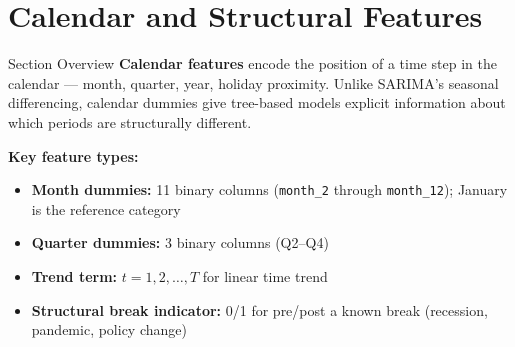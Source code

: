 \documentclass[aspectratio=169, 10pt]{beamer}
\begin{document}
\section{Calendar and Structural Features}


\begin{frame}{Section Overview}
  \textbf{Calendar features} encode the position of a time step
  in the calendar --- month, quarter, year, holiday proximity.
  Unlike SARIMA's seasonal differencing, calendar dummies give
  tree-based models explicit information about which periods are
  structurally different.

  \medskip
  \textbf{Key feature types:}
  \begin{itemize}
    \item \textbf{Month dummies:} 11 binary columns
          (\texttt{month\_2} through \texttt{month\_12});
          January is the reference category
    \item \textbf{Quarter dummies:} 3 binary columns (Q2--Q4)
    \item \textbf{Trend term:} $t = 1, 2, \ldots, T$
          for linear time trend
    \item \textbf{Structural break indicator:} 0/1 for
          pre/post a known break (recession, pandemic, policy
          change)
  \end{itemize}
\end{frame}
\end{document}
